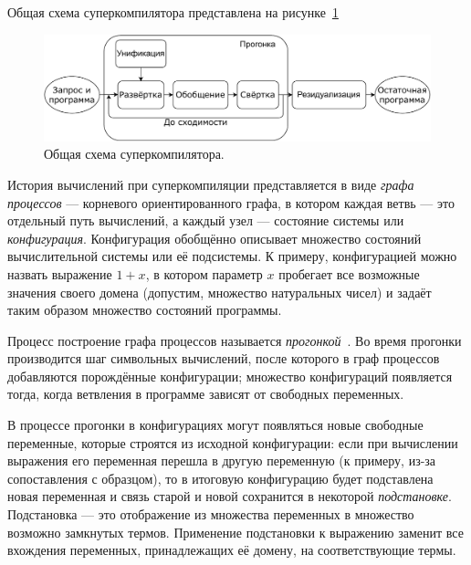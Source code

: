 Общая схема суперкомпилятора представлена на рисунке~\ref{fig:scompScheme}

\begin{figure}
\center
\includegraphics[scale=0.8]{./review/scompflow.pdf}
\caption{Общая схема суперкомпилятора.}
\label{fig:scompScheme}
\end{figure}

История вычислений при суперкомпиляции представляется в виде \emph{графа процессов} --- корневого ориентированного графа,
в котором каждая ветвь --- это отдельный путь вычислений, а каждый узел --- состояние системы или \emph{конфигурация}.
Конфигурация обобщённо описывает множество состояний вычислительной системы или её подсистемы.
К примеру, конфигурацией можно назвать выражение $1 + x$, в котором параметр $x$ пробегает
все возможные значения своего домена (допустим, множество натуральных чисел) и задаёт
таким образом множество состояний программы\cite{turchinSC}.

Процесс построение графа процессов называется \emph{прогонкой}~.
Во время прогонки производится шаг символьных вычислений, после которого
в граф процессов добавляются порождённые конфигурации; множество конфигураций
появляется тогда, когда ветвления в программе зависят от свободных переменных.

В процессе прогонки в конфигурациях могут появляться новые свободные переменные,
которые строятся из исходной конфигурации:
если при вычислении выражения его переменная перешла в другую переменную (к примеру, из-за сопоставления с образцом),
то в итоговую конфигурацию будет подставлена новая переменная и связь старой и новой сохранится в
некоторой \emph{подстановке}.
Подстановка --- это отображение из множества переменных в множество возможно замкнутых термов.
Применение подстановки к выражению заменит все вхождения переменных, принадлежащих её домену,
на соответствующие термы. %

